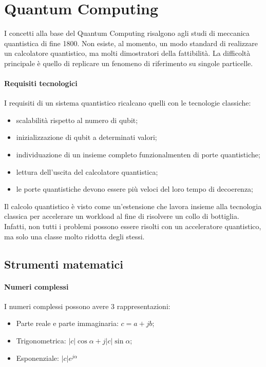 \documentclass{article}
\begin{document}
\clearpage
\section{Quantum Computing}
I concetti alla base del Quantum Computing risalgono agli studi di meccanica quantistica di fine 1800. Non esiste, al momento, un modo standard di realizzare un calcolatore quantistico, ma molti dimostratori della fattibilità. La difficoltà principale è quello di replicare un fenomeno di riferimento su singole particelle.

\paragraph{Requisiti tecnologici} 
I requisiti di un sistema quantistico ricalcano quelli con le tecnologie classiche:
\begin{itemize}
    \item scalabilità rispetto al numero di qubit;
    \item inizializzazione di qubit a determinati valori;
    \item individuazione di un insieme completo funzionalmenten di porte quantistiche;
    \item lettura dell'uscita del calcolatore quantistica;
    \item le porte quantistiche devono essere più veloci del loro tempo di decoerenza;
\end{itemize}

Il calcolo quantistico è visto come un'estensione che lavora insieme alla tecnologia classica per accelerare un workload al fine di risolvere un collo di bottiglia. Infatti, non tutti i problemi possono essere risolti con un acceleratore quantistico, ma solo una classe molto ridotta degli stessi.

\subsection{Strumenti matematici}

\paragraph{Numeri complessi}
I numeri complessi possono avere 3 rappresentazioni:
\begin{itemize}
    \item Parte reale e parte immaginaria: $c = a+jb$;
    \item Trigonometrica: $|c|\cos \alpha + j |c| \sin \alpha$;
    \item Esponenziale: $|c| e^{j\alpha}$
\end{itemize}
\end{document}
